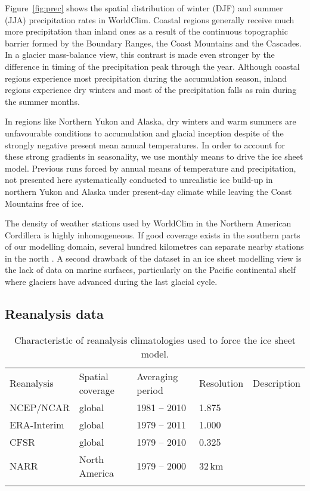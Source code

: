 Figure~\ref{fig:prec} shows the spatial distribution of winter (DJF) and summer (JJA) precipitation rates in WorldClim. Coastal regions generally receive much more precipitation than inland ones as a result of the continuous topographic barrier formed by the Boundary Ranges, the Coast Mountains and the Cascades. In a glacier mass-balance view, this contrast is made even stronger by the difference in timing of the precipitation peak through the year. Although coastal regions experience most precipitation during the accumulation season, inland regions experience dry winters and most of the precipitation falls as rain during the summer months.

In regions like Northern Yukon and Alaska, dry winters and warm summers are unfavourable conditions to accumulation and glacial inception despite of the strongly negative present mean annual temperatures. In order to account for these strong gradients in seasonality, we use monthly means to drive the ice sheet model. Previous runs forced by annual means of temperature and precipitation, not presented here systematically conducted to unrealistic ice build-up in northern Yukon and Alaska under present-day climate while leaving the Coast Mountains free of ice.

The density of weather stations used by WorldClim in the Northern American Cordillera is highly inhomogeneous. If good coverage exists in the southern parts of our modelling domain, several hundred kilometres can separate nearby stations in the north \citep{data:worldclim}. A second drawback of the dataset in an ice sheet modelling view is the lack of data on marine surfaces, particularly on the Pacific continental shelf where glaciers have advanced during the last glacial cycle\needref.


\subsection{Reanalysis data}

\begin{table*}[t]
	\caption{Characteristic of reanalysis climatologies used to force the ice sheet model.}
	\label{tab:reanalyses}
	\vskip4mm
	\centering
	\begin{tabular}{lllll}
		\tophline
		Reanalysis& Spatial coverage& Averaging period& Resolution& Description\\
		\middlehline
		NCEP/NCAR&  global&     1981 -- 2010& 1.875\degree& \citet{data:ncar}\\
		ERA-Interim&global&     1979 -- 2011& 1.000\degree& \citet{data:erai}\\
		CFSR&       global&     1979 -- 2010& 0.325\degree& \citet{data:cfsr}\\
		NARR&       North America& 1979 -- 2000& 32\,km& \citet{data:narr}\\
		\bottomhline
	\end{tabular}
\end{table*}

